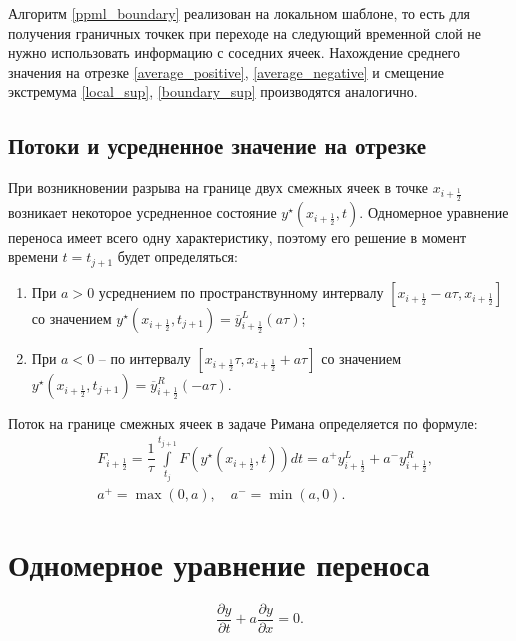 \documentclass[12pt,a4paper]{article}
\newcommand{\half}{\frac{1}{2}}
\begin{document}
    Алгоритм \eqref{ppml_boundary} реализован на локальном шаблоне, то есть для получения граничных точкек при переходе на следующий временной слой не нужно использовать информацию с соседних ячеек. Нахождение среднего значения на отрезке \eqref{average_positive}, \eqref{average_negative} и смещение экстремума \eqref{local_sup}, \eqref{boundary_sup} производятся аналогично.


    \subsection{Потоки и усредненное значение на отрезке}

    При возникновении разрыва на границе двух смежных ячеек в точке $ x_{i+\half} $ возникает некоторое усредненное состояние $ y^\star(x_{i+\half}, t) $. Одномерное уравнение переноса имеет всего одну характеристику, поэтому его решение в момент времени $ t = t_{j+1} $ будет определяться:
    \begin{enumerate}
        \item При $ a > 0 $ усреднением по пространствунному интервалу $ [x_{i+\half}-a \tau, x_{i+\half}] $ со значением $ y^\star(x_{i+\half}, t_{j+1}) = \overline y_{i+\half}^L(a \tau) $;
        
        \item При $ a < 0 $ -- по интервалу $ [x_{i+\half} \tau, x_{i+\half}+a \tau] $ со значением $ y^\star(x_{i+\half}, t_{j+1}) = \overline y_{i+\half}^R(-a \tau) $.
    \end{enumerate}

    Поток на границе смежных ячеек в задаче Римана определяется по формуле:
    \begin{equation}
        \label{boundary_flow}
        \begin{split}
            &F_{i+\half} = \dfrac{1}{\tau} \displaystyle \int\limits_{t_j}^{t_{j+1}} F(y^\star(x_{i+\half}, t))dt = a^+ y_{i+\half}^L + a^- y_{i+\half}^R, \\[0.5em]
            &a^+ = \max(0, a), \quad a^- = \min(a, 0).
        \end{split}
    \end{equation}

    \section{ Одномерное уравнение переноса }

    \begin{equation}
        \label{convection-diffusion}
      \dfrac{\partial y}{\partial t} + a \dfrac{\partial y}{\partial x} = 0.  
    \end{equation}
\end{document}
